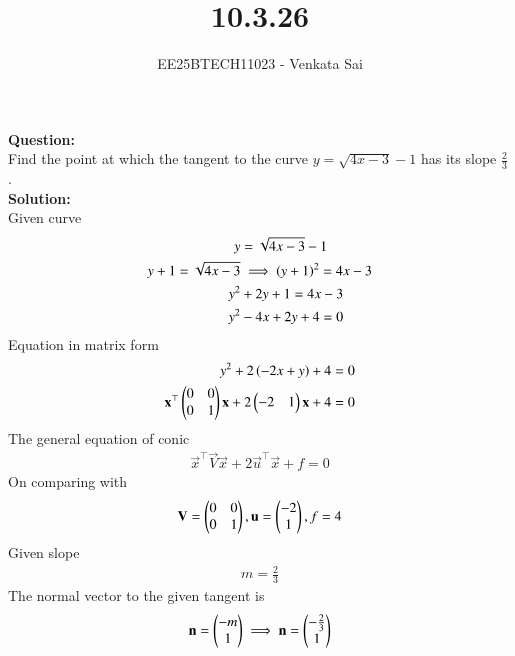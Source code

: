 \documentclass[journal]{IEEEtran}
\begin{document}


\title{10.3.26}
\author{EE25BTECH11023 - Venkata Sai}
\maketitle 
\renewcommand{\thefigure}{\theenumi}
\renewcommand{\thetable}{\theenumi}
\setlength{\intextsep}{10pt} %

\renewcommand{\thetable}{\theenumi}
\vspace{-2em}
\textbf{Question:}  \\
Find the point at which the tangent to the curve $y = \sqrt{4x-3}-1$ has its slope $\frac{2}{3}$ .\\
\textbf{Solution:}  \\
Given curve
\begin{align}
y &= \sqrt{4x-3}-1 \\
y+1=\sqrt{4x-3} &\implies \left(y+1\right)^2 =4x-3 \\
y^2&+2y+1=4x-3 \\
y^2&-4x+2y+4=0
\end{align}
Equation  in matrix form
\begin{align}
y^2+2\left(-2x+y\right)+4=0 \\
\mathbf{x}^\top\begin{pmatrix}0&0\\0&1\end{pmatrix}\mathbf{x}+2\begin{pmatrix}-2&1\end{pmatrix}\mathbf{x}+4=0
\end{align}
The general equation of conic
\begin{align}
    \vec{x}^\top\vec{V}\vec{x} + 2\vec{u}^\top\vec{x} + f = 0
\end{align}
On comparing  with 
\begin{align}
\mathbf{V}=\begin{pmatrix}0&0\\0&1\end{pmatrix},\mathbf{u}=\begin{pmatrix}-2\\1\end{pmatrix},f=4
\end{align}
Given slope
\begin{align}
    m=\frac{2}{3}
\end{align}
The normal vector to the given tangent is 
\begin{align}
    \mathbf{n}=\begin{pmatrix}-m\\1\end{pmatrix} \implies \mathbf{n}=\begin{pmatrix}-\frac{2}{3}\\1\end{pmatrix} 
    \end{align}
\end{document}
